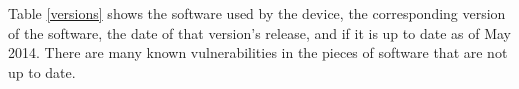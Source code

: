 \documentclass[letterpaper,twocolumn,10pt]{article}
\begin{document}
Table \ref{versions} shows the software used by the device, the corresponding version of the software, the date of that version's release, and if it is up to date as of May 2014.  There are many known vulnerabilities in the pieces of software that are not up to date.  

%
%
\end{document}
